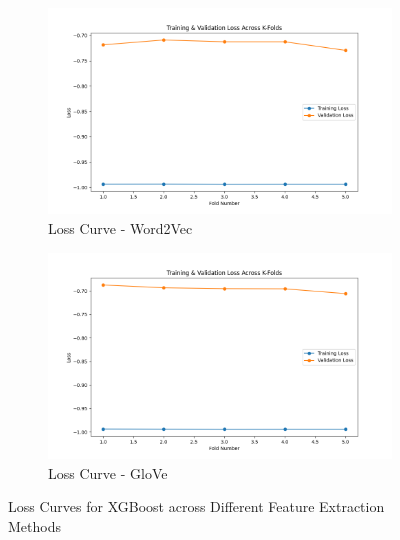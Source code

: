 \begin{figure}[H]
    \begin{subfigure}[b]{0.47\textwidth}
        \includegraphics[width=\textwidth]{img/report_info/img/1.3.XGB/best_xgboost_word2vec_loss.png}
        \caption{Loss Curve - Word2Vec}
        \label{fig:lr-word2vec-loss}
    \end{subfigure}
    \begin{subfigure}[b]{0.47\textwidth}
        \includegraphics[width=\textwidth]{img/report_info/img/1.3.XGB/best_xgboost_glove_loss.png}
        \caption{Loss Curve - GloVe}
        \label{fig:lr-glove-loss}
    \end{subfigure}
    
    \caption{Loss Curves for XGBoost across Different Feature Extraction Methods}
    \label{fig:lr-loss-group}
\end{figure}

